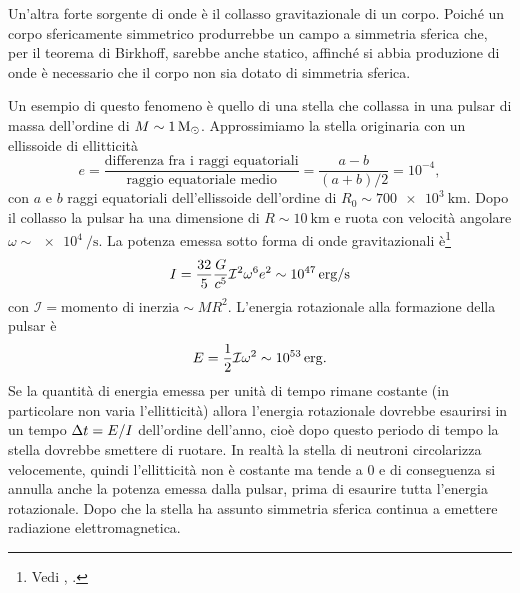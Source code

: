 Un'altra forte sorgente di onde è il collasso gravitazionale di un corpo.
Poiché un corpo sfericamente simmetrico produrrebbe un campo a simmetria sferica
che, per il teorema di Birkhoff, sarebbe anche statico, affinché si abbia
produzione di onde è necessario che il corpo non sia dotato di simmetria
sferica.

Un esempio di questo fenomeno è quello di una stella che collassa in una pulsar
di massa dell'ordine di $M \sim \SI{1}{\ensuremath{M_{\odot}}}$.  Approssimiamo la stella
originaria con un ellissoide di ellitticità
\begin{equation}
  e = \frac{\text{differenza fra i raggi equatoriali}}{\text{raggio equatoriale
      medio}}  = \frac{a-b}{(a+b)/2} = 10^{-4},
\end{equation}
con $a$ e $b$ raggi equatoriali dell'ellissoide dell'ordine di
$R_{0} \sim \SI{700e3}{\kilo\metre}$.  Dopo il collasso la pulsar ha una
dimensione di $R \sim \SI{10}{\kilo\metre}$ e ruota con velocità angolare
$\omega \sim \SI{e4}{\per\second}$.  La potenza emessa
sotto forma di onde gravitazionali
è\footnote{Vedi \textcite[488]{shapiro:black-holes},
  \textcite[272]{weinberg:gravitation}.}
\begin{equation}
  I = \frac{32}{5} \frac{G}{c^{5}} \mathcal{I}^{2} \omega^{6} e^{2} \sim
  \SI{e47}{erg\per\second}
\end{equation}
con $\mathcal{I} = \text{momento di inerzia} \sim MR^{2}$.  L'energia
rotazionale alla formazione della pulsar è
\begin{equation}
  E = \frac{1}{2} \mathcal{I} \omega^{2} \sim \SI{e53}{erg}.
\end{equation}
Se la quantità di energia emessa per unità di tempo rimane costante (in
particolare non varia l'ellitticità) allora l'energia rotazionale dovrebbe
esaurirsi in un tempo $\Delta t = E/I$ dell'ordine dell'anno, cioè dopo questo
periodo di tempo la stella dovrebbe smettere di ruotare.  In realtà la stella di
neutroni circolarizza velocemente, quindi l'ellitticità non è costante ma tende
a $0$ e di conseguenza si annulla anche la potenza emessa dalla pulsar, prima di
esaurire tutta l'energia rotazionale.  Dopo che la stella ha assunto simmetria
sferica continua a emettere radiazione elettromagnetica.
